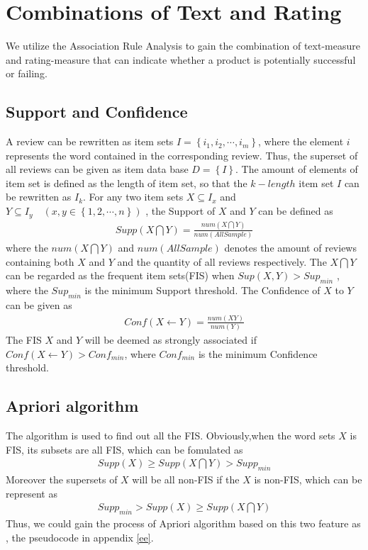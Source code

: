 \documentclass[12pt]{article}%
\begin{document}
\section{Combinations of Text and Rating}
We utilize the Association Rule Analysis to gain the combination of text-measure and rating-measure that can indicate whether a product is potentially successful or failing.
\subsection{Support and Confidence}
A review can be rewritten as item sets $I=\left \{  i_{1},i_{2},\cdots,i_{m}\right \}$, where the element $i$ represents the word contained in the corresponding review. Thus, the superset of all reviews can be given as item data base $D=\left \{ I \right \}$. The amount of elements of item set is defined as the length of item set, so that the $k-length$ item set $I$ can be rewritten as $I_{k}$. For any two item sets $X\subseteq I_{x}$ and $Y\subseteq I_{y}\quad(x,y\in \left \{ 1,2,\cdots,n \right \})$ , the Support of $X$ and $Y$ can be defined as 
\begin{gather}
Supp(X\bigcap Y)=\frac{num(X\bigcap Y)}{num(AllSample)}
\end{gather}
where the $num(X\bigcap Y)$ and $num(AllSample)$ denotes the amount of reviews containing both $X$ and $Y$ and the quantity of all reviews respectively. The $X\bigcap Y$ can be regarded as the frequent item sets(FIS)\cite{bib:4} when $Sup(X,Y)>Sup_{min}$ ,  where the  $Sup_{min}$ is the minimum Support threshold. The Confidence of $X$ to $Y$ can be given as 
\begin{gather}
Conf(X\leftarrow Y)=\frac{num(XY)}{num(Y)}
\end{gather}
 The FIS $X$ and $Y$ will be deemed as strongly associated\cite{bib:4} if $Conf(X\leftarrow Y)>Conf_{min}$, where $Conf_{min}$ is the minimum Confidence threshold.
\subsection{Apriori algorithm}
The algorithm is used to find out all the FIS. Obviously,when the word sets $X$ is FIS,
its subsets are all FIS\cite{bib:66}, which can be fomulated as 
\begin{gather}
Supp(X)\geqslant Supp(X\bigcap Y)>Supp_{min}
\end{gather}
Moreover the supersets of $X$ will be all non-FIS if the $X$ is non-FIS\cite{bib:66}, which can be represent as
\begin{gather}
Supp_{min}>Supp(X)\geqslant Supp(X\bigcap Y)
\end{gather}
Thus, we could gain the process of Apriori algorithm based on this two feature as , the pseudocode in appendix \ref{ee}.
\end{document}
